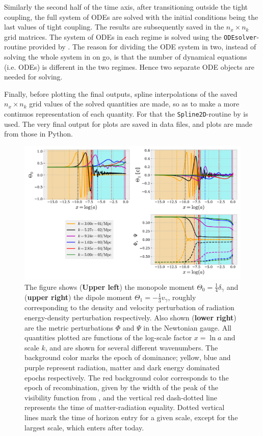 \documentclass[twocolumn]{aastex62}
\begin{document}
Similarly the second half of the time axis, after transitioning outside the tight coupling, the full system of ODEs are solved with the initial conditions being the last values of tight coupling. The results are subsequently saved in the $n_x\times n_k$ grid matrices. The system of ODEs in each regime is solved using the \texttt{ODEsolver}-routine provided by \cite{winther:2020b}. The reason for dividing the ODE system in two, instead of solving the whole system in on go, is that the number of dynamical equations (i.e. ODEs) is different in the two regimes. Hence two separate ODE objects are needed for solving. 

Finally, before plotting the final outputs, spline interpolations of the saved $n_x\times n_k$ grid values of the solved quantities are made, so as to make a more continuos representation of each quantity. For that the \texttt{Spline2D}-routine by \cite{winther:2020b} is used. The very final output for plots are saved in data files, and plots are made from those in Python.

\begin{figure}
    \includegraphics[scale = 0.65]{Figures/fig1.pdf}
    \caption{The figure shows (\textbf{Upper left}) the monopole moment $\Theta_0 = \frac{1}{4}\delta_\gamma$ and (\textbf{upper right}) the dipole moment $\Theta_1 = -\frac{1}{3}v_\gamma$, roughly corresponding to the density and velocity perturbation of radiation energy-density perturbation respectively. Also shown (\textbf{lower right}) are the metric perturbations $\Phi$ and $\Psi$ in the Newtonian gauge. All quantities plotted are functions of the log-scale factor $x = \ln a$ and scale $k$, and are shown for several different wavenumbers. The background color marks the epoch of dominance; yellow, blue and purple represent radiation, matter and dark energy dominated epochs respectively. The red background color corresponds to the epoch of recombination, given by the width of the peak of the visibility function from \cite{stutzer:2020b}, and the vertical red dash-dotted line represents the time of matter-radiation equality. Dotted vertical lines mark the time of horizon entry for a given scale, except for the largest scale, which enters after today.} 
    \label{fig:fig1}
\end{figure}
\end{document}
